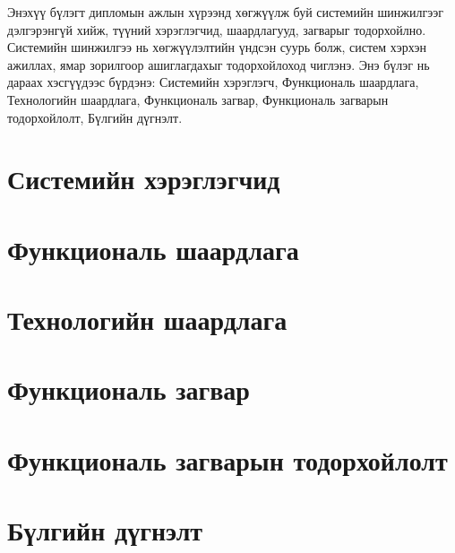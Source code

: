 Энэхүү бүлэгт дипломын ажлын хүрээнд хөгжүүлж буй системийн шинжилгээг дэлгэрэнгүй хийж, түүний хэрэглэгчид, шаардлагууд, загварыг тодорхойлно. Системийн шинжилгээ нь хөгжүүлэлтийн үндсэн суурь болж, систем хэрхэн ажиллах, ямар зорилгоор ашиглагдахыг тодорхойлоход чиглэнэ. Энэ бүлэг нь дараах хэсгүүдээс бүрдэнэ: Системийн хэрэглэгч, Функциональ шаардлага, Технологийн шаардлага, Функциональ загвар, Функциональ загварын тодорхойлолт, Бүлгийн дүгнэлт.

\section{Системийн хэрэглэгчид}


\section{Функциональ шаардлага}


\section{Технологийн шаардлага}


\section{Функциональ загвар}


\section{Функциональ загварын тодорхойлолт}



\section{Бүлгийн дүгнэлт}
